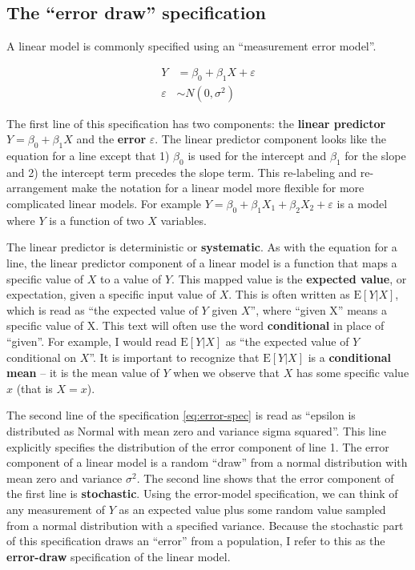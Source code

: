 \documentclass[]{book}
\begin{document}
\hypertarget{the-error-draw-specification}{%
\subsection{The ``error draw'' specification}\label{the-error-draw-specification}}

A linear model is commonly specified using an ``measurement error model''.

\begin{align}
Y &= \beta_0 + \beta_1 X + \varepsilon\\
\varepsilon &\sim N(0, \sigma^2)
\label{eq:error-spec}
\end{align}

The first line of this specification has two components: the \textbf{linear predictor} \(Y = \beta_0 + \beta_1 X\) and the \textbf{error} \(\varepsilon\). The linear predictor component looks like the equation for a line except that 1) \(\beta_0\) is used for the intercept and \(\beta_1\) for the slope and 2) the intercept term precedes the slope term. This re-labeling and re-arrangement make the notation for a linear model more flexible for more complicated linear models. For example \(Y = \beta_0 + \beta_1 X_1 + \beta_2 X_2 + \varepsilon\) is a model where \(Y\) is a function of two \(X\) variables.

The linear predictor is deterministic or \textbf{systematic}. As with the equation for a line, the linear predictor component of a linear model is a function that maps a specific value of \(X\) to a value of \(Y\). This mapped value is the \textbf{expected value}, or expectation, given a specific input value of \(X\). This is often written as \(\mathrm{E}[Y|X]\), which is read as ``the expected value of \(Y\) given \(X\)'', where ``given X'' means a specific value of X. This text will often use the word \textbf{conditional} in place of ``given''. For example, I would read \(\mathrm{E}[Y|X]\) as ``the expected value of \(Y\) conditional on \(X\)''. It is important to recognize that \(\mathrm{E}[Y|X]\) is a \textbf{conditional mean} -- it is the mean value of \(Y\) when we observe that \(X\) has some specific value \(x\) (that is \(X = x\)).

The second line of the specification \eqref{eq:error-spec} is read as ``epsilon is distributed as Normal with mean zero and variance sigma squared''. This line explicitly specifies the distribution of the error component of line 1. The error component of a linear model is a random ``draw'' from a normal distribution with mean zero and variance \(\sigma^2\). The second line shows that the error component of the first line is \textbf{stochastic}. Using the error-model specification, we can think of any measurement of \(Y\) as an expected value plus some random value sampled from a normal distribution with a specified variance. Because the stochastic part of this specification draws an ``error'' from a population, I refer to this as the \textbf{error-draw} specification of the linear model.
\end{document}
